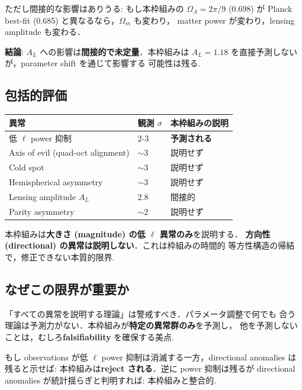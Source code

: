 \documentclass[11pt,a4paper]{article}
\begin{document}
ただし間接的な影響はありうる: もし本枠組みの $\Omega_\Lambda = 2\pi/9$
(0.698) が Planck best-fit (0.685) と異なるなら，$\Omega_m$ も変わり，
matter power が変わり，lensing amplitude も変わる．

\begin{tcolorbox}[colback=yellow!5,colframe=orange!60!black]
\textbf{結論}: $A_L$ への影響は\textbf{間接的で未定量}．本枠組みは
$A_L = 1.18$ を直接予測しないが，parameter shift を通じて影響する
可能性は残る.
\end{tcolorbox}

\subsection{包括的評価}

\begin{center}
\begin{tabular}{lll}
\toprule
異常 & 観測 $\sigma$ & 本枠組みの説明 \\
\midrule
低 $\ell$ power 抑制 & $2\text{-}3$ & \textbf{予測される} \\
Axis of evil (quad-oct alignment) & $\sim 3$ & 説明せず \\
Cold spot & $\sim 3$ & 説明せず \\
Hemispherical asymmetry & $\sim 3$ & 説明せず \\
Lensing amplitude $A_L$ & $2.8$ & 間接的 \\
Parity asymmetry & $\sim 2$ & 説明せず \\
\bottomrule
\end{tabular}
\end{center}

本枠組みは\textbf{大きさ (magnitude) の低 $\ell$ 異常のみ}を説明する．
\textbf{方向性 (directional) の異常は説明しない}．これは枠組みの時間的
等方性構造の帰結で，修正できない本質的限界.

\subsection{なぜこの限界が重要か}

「すべての異常を説明する理論」は警戒すべき．パラメータ調整で何でも
合う理論は予測力がない．本枠組みが\textbf{特定の異常群のみ}を予測し，
他を予測しないことは，むしろ\textbf{falsifiability} を確保する美点.

もし observations が低 $\ell$ power 抑制は消滅する一方，directional
anomalies は残ると示せば: 本枠組みは\textbf{reject される}．逆に
power 抑制は残るが directional anomalies が統計揺らぎと判明すれば:
本枠組みと整合的.
\end{document}

